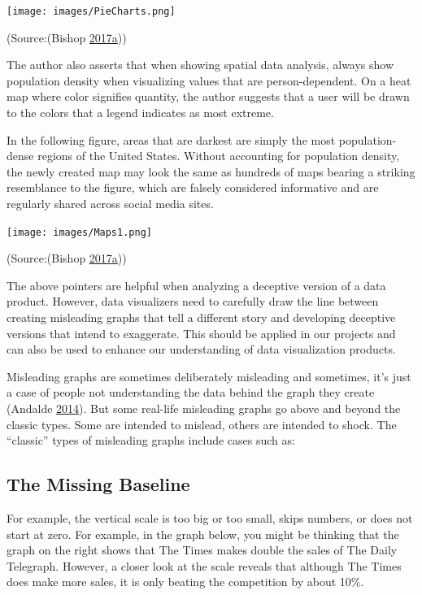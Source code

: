 \documentclass[]{book}
\begin{document}
\texttt{[image: images/PieCharts.png]}

(Source:(Bishop \protect\hyperlink{ref-visual-lies}{2017}\protect\hyperlink{ref-visual-lies}{a}))

The author also asserts that when showing spatial data analysis, always show population density when visualizing values that are person-dependent. On a heat map where color signifies quantity, the author suggests that a user will be drawn to the colors that a legend indicates as most extreme.

In the following figure, areas that are darkest are simply the most population-dense regions of the United States. Without accounting for population density, the newly created map may look the same as hundreds of maps bearing a striking resemblance to the figure, which are falsely considered informative and are regularly shared across social media sites.

\texttt{[image: images/Maps1.png]}

(Source:(Bishop \protect\hyperlink{ref-visual-lies}{2017}\protect\hyperlink{ref-visual-lies}{a}))

The above pointers are helpful when analyzing a deceptive version of a data product. However, data visualizers need to carefully draw the line between creating misleading graphs that tell a different story and developing deceptive versions that intend to exaggerate. This should be applied in our projects and can also be used to enhance our understanding of data visualization products.

Misleading graphs are sometimes deliberately misleading and sometimes, it's just a case of people not understanding the data behind the graph they create (Andalde \protect\hyperlink{ref-andale_2014}{2014}). But some real-life misleading graphs go above and beyond the classic types. Some are intended to mislead, others are intended to shock. The ``classic'' types of misleading graphs include cases such as:

\hypertarget{the-missing-baseline}{%
\subsection{The Missing Baseline}\label{the-missing-baseline}}

For example, the vertical scale is too big or too small, skips numbers, or does not start at zero. For example, in the graph below, you might be thinking that the graph on the right shows that The Times makes double the sales of The Daily Telegraph. However, a closer look at the scale reveals that although The Times does make more sales, it is only beating the competition by about 10\%.
\end{document}
